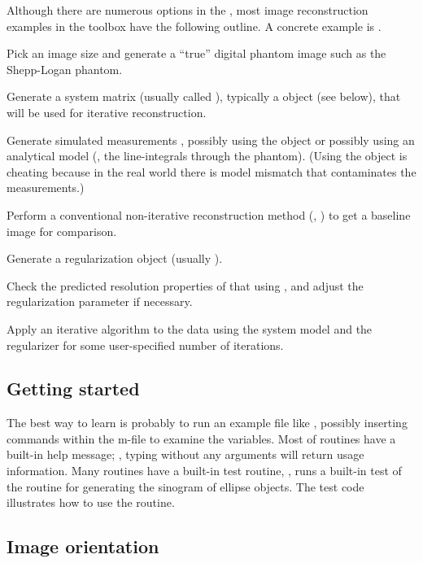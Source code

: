 
Although there are numerous options
in the \irt,
most image reconstruction examples
in the toolbox
have the following outline.
A concrete example
is .

\blist
\item
Pick an image size
and generate a ``true'' digital phantom image
such as the Shepp-Logan phantom.
\item
Generate a system matrix
(usually called ),
typically a \fatrixx object (see below),
that will be used for iterative reconstruction.
\item
Generate simulated measurements ,
possibly using the \fatrixx object
or possibly using an analytical model
(\eg, the line-integrals through the phantom).
(Using the \fatrixx object
is cheating because in the real world
there is model mismatch that contaminates the measurements.)
\item
Perform a conventional non-iterative reconstruction method
(\eg, )
to get a baseline image for comparison.
\item
Generate a regularization object
(usually ).
\item
Check the predicted resolution properties
of that 
using ,
and adjust the regularization parameter \bet
if necessary.
\item
Apply an iterative algorithm
to the data 
using the system model  and the regularizer 
for some user-specified number of iterations.
\elist



\subsection{Getting started}

The best way to learn
is probably to run an example file
like
,
possibly
inserting  commands
within the m-file
to examine the variables.
Most of \irt routines
have a built-in help message;
\eg,
typing 
without any arguments
will return usage information.
Many \irt routines
have a built-in test routine,
\eg,
runs a built-in test
of the routine for generating
the sinogram of ellipse objects.
The test code illustrates
how to use the routine.


\subsection{Image orientation}

